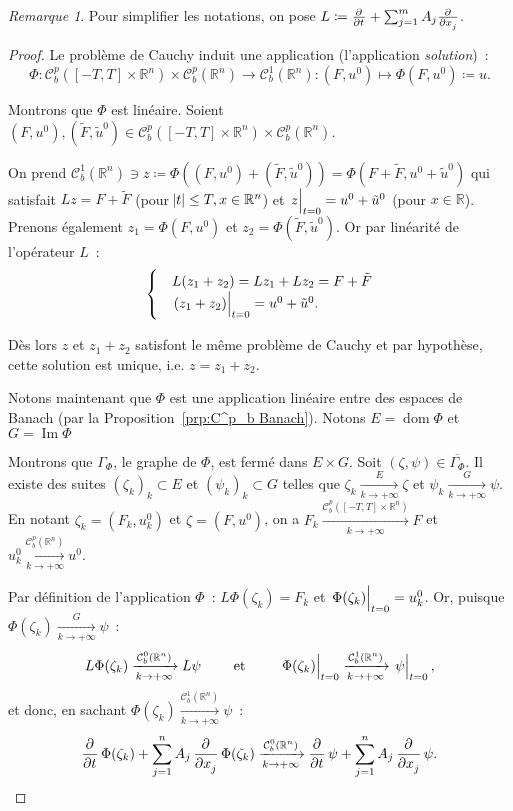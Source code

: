 \documentclass{report}
\DeclareMathOperator{\dom}{dom}
\DeclareMathOperator{\Imapp}{Im}
\newcommand{\R}{{\mathbb R}}
\newcommand{\pinfty}{{+\infty}}
\newcommand{\restr}[2]{\left.#1\vphantom{\big|}\right|_{#2}}
\theoremstyle{definition}
\theoremstyle{remark}
\newtheorem*{rmq}{Remarque}
\begin{document}
\begin{rmq} Pour simplifier les notations, on pose $L \coloneqq \pd {}t + \sum_{j=1}^mA_j\pd {}{x_j}$.
\end{rmq}

\begin{proof} Le problème de Cauchy induit une application (l'application \textit{solution})~:
\[\Phi : \mathcal C^p_b([-T, T] \times \R^n) \times \mathcal C^p_b(\R^n) \to \mathcal C^1_b(\R^n) : (F, u^0) \mapsto \Phi(F, u^0) \coloneqq u.\]

Montrons que $\Phi$ est linéaire. Soient $(F, u^0), (\tilde F, \tilde u^0) \in \mathcal C^p_b([-T, T] \times \R^n) \times \mathcal C^p_b(\R^n)$.

On prend $\mathcal C^1_b(\R^n) \ni z \coloneqq \Phi\left((F, u^0) + (\tilde F, \tilde u^0)\right) = \Phi(F+\tilde F, u^0 + \tilde u^0)$ qui satisfait $Lz = F+\tilde F$
(pour $\abs t \leq T, x \in \R^n$) et $\restr z{t=0} = u^0+\tilde u^0$ (pour $x \in \R$). Prenons également $z_1 = \Phi(F, u^0)$ et $z_2 = \Phi(\tilde F, \tilde u^0)$.
Or par linéarité de l'opérateur $L$~:
\[\begin{cases}&L(z_1+z_2) = Lz_1 + Lz_2 = F+\tilde F\\&\restr {(z_1+z_2)}{t=0} = u^0 + \tilde u^0.\end{cases}\]

Dès lors $z$ et $z_1+z_2$ satisfont le même problème de Cauchy et par hypothèse, cette solution est unique, i.e. $z = z_1 + z_2$.

Notons maintenant que $\Phi$ est une application linéaire entre des espaces de Banach (par la Proposition~\ref{prp:C^p_b Banach}). Notons $E = \dom \Phi$ et $G = \Imapp \Phi$

Montrons que $\Gamma_\Phi$, le graphe de $\Phi$, est fermé dans $E \times G$. Soit $(\zeta, \psi) \in \overline {\Gamma_\Phi}$. Il existe des suites $(\zeta_k)_k \subset E$
et $(\psi_k)_k \subset G$ telles que $\zeta_k \xrightarrow[k \to \pinfty]{E} \zeta$ et $\psi_k \xrightarrow[k \to \pinfty]{G} \psi$. En notant $\zeta_k = (F_k, u^0_k)$
et $\zeta = (F, u^0)$, on a $F_k \xrightarrow[k \to \pinfty]{\mathcal C^p_b([-T, T] \times \R^n)} F$ et $u^0_k \xrightarrow[k \to \pinfty]{\mathcal C^p_b(\R^n)} u^0$.

Par définition de l'application $\Phi$~: $L\Phi(\zeta_k) = F_k$ et $\restr{\Phi(\zeta_k)}{t=0} = u^0_k$. Or, puisque $\Phi(\zeta_k) \xrightarrow[k \to \pinfty]{G} \psi$~:
\[L\Phi(\zeta_k) \xrightarrow[k \to \pinfty]{\mathcal C^0_b(\R^n)} L\psi \qquad \text{ et } \qquad \restr {\Phi(\zeta_k)}{t=0} \xrightarrow[k \to \pinfty]{\mathcal C^1_b(\R^n)} \restr \psi{t=0},\]
et donc, en sachant $\Phi(\zeta_k) \xrightarrow[k \to \pinfty]{\mathcal C^1_b(\R^n)} \psi$~:
\[\dpd {}t\Phi(\zeta_k) + \sum_{j=1}^nA_j\dpd {}{x_j}\Phi(\zeta_k) \xrightarrow[k \to \pinfty]{\mathcal C^0_b(\R^n)} \dpd {}t\psi + \sum_{j=1}^nA_j\dpd {}{x_j}\psi.\]


\end{proof}
\end{document}
